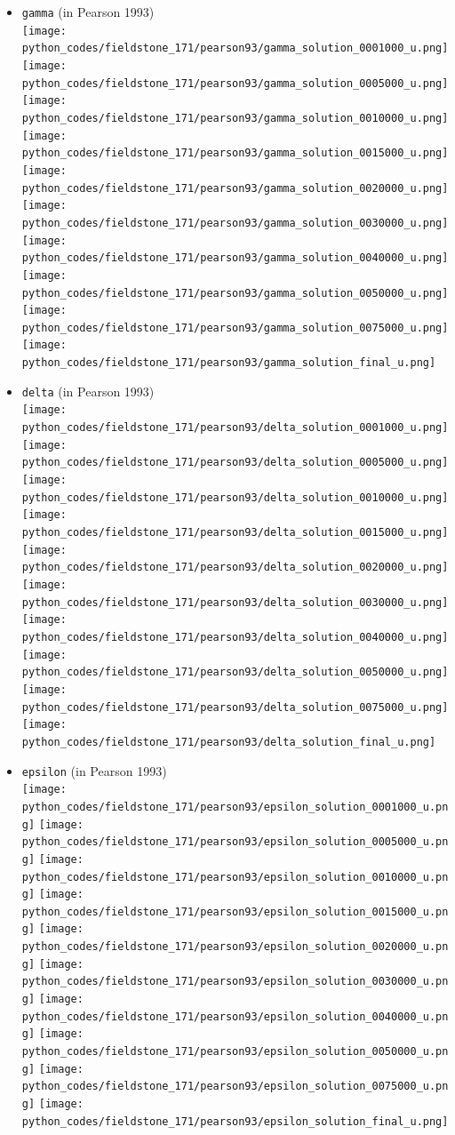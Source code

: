 \begin{itemize}
\item {\tt gamma} (in Pearson 1993)\\
\texttt{[image: python\_codes/fieldstone\_171/pearson93/gamma\_solution\_0001000\_u.png]}
\texttt{[image: python\_codes/fieldstone\_171/pearson93/gamma\_solution\_0005000\_u.png]}
\texttt{[image: python\_codes/fieldstone\_171/pearson93/gamma\_solution\_0010000\_u.png]}
\texttt{[image: python\_codes/fieldstone\_171/pearson93/gamma\_solution\_0015000\_u.png]}
\texttt{[image: python\_codes/fieldstone\_171/pearson93/gamma\_solution\_0020000\_u.png]}
\texttt{[image: python\_codes/fieldstone\_171/pearson93/gamma\_solution\_0030000\_u.png]}
\texttt{[image: python\_codes/fieldstone\_171/pearson93/gamma\_solution\_0040000\_u.png]}
\texttt{[image: python\_codes/fieldstone\_171/pearson93/gamma\_solution\_0050000\_u.png]}
\texttt{[image: python\_codes/fieldstone\_171/pearson93/gamma\_solution\_0075000\_u.png]}
\texttt{[image: python\_codes/fieldstone\_171/pearson93/gamma\_solution\_final\_u.png]}


\item {\tt delta} (in Pearson 1993)\\
\texttt{[image: python\_codes/fieldstone\_171/pearson93/delta\_solution\_0001000\_u.png]}
\texttt{[image: python\_codes/fieldstone\_171/pearson93/delta\_solution\_0005000\_u.png]}
\texttt{[image: python\_codes/fieldstone\_171/pearson93/delta\_solution\_0010000\_u.png]}
\texttt{[image: python\_codes/fieldstone\_171/pearson93/delta\_solution\_0015000\_u.png]}
\texttt{[image: python\_codes/fieldstone\_171/pearson93/delta\_solution\_0020000\_u.png]}
\texttt{[image: python\_codes/fieldstone\_171/pearson93/delta\_solution\_0030000\_u.png]}
\texttt{[image: python\_codes/fieldstone\_171/pearson93/delta\_solution\_0040000\_u.png]}
\texttt{[image: python\_codes/fieldstone\_171/pearson93/delta\_solution\_0050000\_u.png]}
\texttt{[image: python\_codes/fieldstone\_171/pearson93/delta\_solution\_0075000\_u.png]}
\texttt{[image: python\_codes/fieldstone\_171/pearson93/delta\_solution\_final\_u.png]}

\item {\tt epsilon} (in Pearson 1993)\\
\texttt{[image: python\_codes/fieldstone\_171/pearson93/epsilon\_solution\_0001000\_u.png]}
\texttt{[image: python\_codes/fieldstone\_171/pearson93/epsilon\_solution\_0005000\_u.png]}
\texttt{[image: python\_codes/fieldstone\_171/pearson93/epsilon\_solution\_0010000\_u.png]}
\texttt{[image: python\_codes/fieldstone\_171/pearson93/epsilon\_solution\_0015000\_u.png]}
\texttt{[image: python\_codes/fieldstone\_171/pearson93/epsilon\_solution\_0020000\_u.png]}
\texttt{[image: python\_codes/fieldstone\_171/pearson93/epsilon\_solution\_0030000\_u.png]}
\texttt{[image: python\_codes/fieldstone\_171/pearson93/epsilon\_solution\_0040000\_u.png]}
\texttt{[image: python\_codes/fieldstone\_171/pearson93/epsilon\_solution\_0050000\_u.png]}
\texttt{[image: python\_codes/fieldstone\_171/pearson93/epsilon\_solution\_0075000\_u.png]}
\texttt{[image: python\_codes/fieldstone\_171/pearson93/epsilon\_solution\_final\_u.png]}


\end{itemize}
